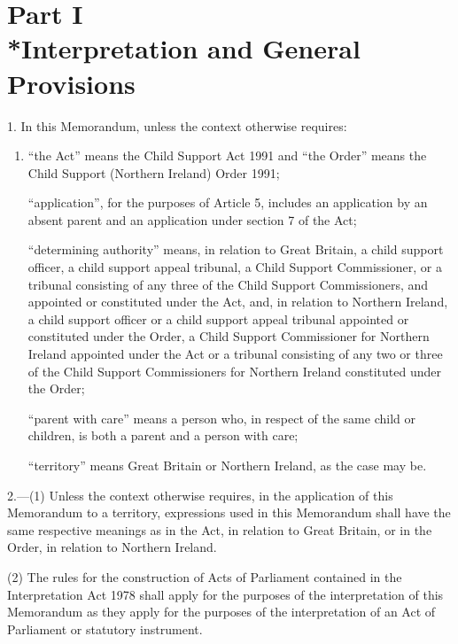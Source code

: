 \documentclass[a4paper]{article}
\newcommand{\parthead}{}
\begin{document}
\section[Part I --- Interpretation and General Provisions]{Part I\\*Interpretation and General Provisions}

\renewcommand\parthead{--- Schedule 1 Part I}

1.  In this Memorandum, unless the context otherwise requires:
\begin{enumerate}\item[]
“the Act” means the Child Support Act 1991 and “the Order” means the Child Support (Northern Ireland) Order 1991;

“application”, for the purposes of Article 5, includes an application by an absent parent and an application under section 7 of the Act;

“determining authority” means, in relation to Great Britain, a child support officer, a child support appeal tribunal, a Child Support Commissioner, or a tribunal consisting of any three of the Child Support Commissioners, and appointed or constituted under the Act, and, in relation to Northern Ireland, a child support officer or a child support appeal tribunal appointed or constituted under the Order, a Child Support Commissioner for Northern Ireland appointed under the Act or a tribunal consisting of any two or three of the Child Support Commissioners for Northern Ireland constituted under the Order;

“parent with care” means a person who, in respect of the same child or children, is both a parent and a person with care;

“territory” means Great Britain or Northern Ireland, as the case may be.
\end{enumerate}

\medskip

2.—(1) Unless the context otherwise requires, in the application of this Memorandum to a territory, expressions used in this Memorandum shall have the same respective meanings as in the Act, in relation to Great Britain, or in the Order, in relation to Northern Ireland.

(2) The rules for the construction of Acts of Parliament contained in the Interpretation Act 1978 shall apply for the purposes of the interpretation of this Memorandum as they apply for the purposes of the interpretation of an Act of Parliament or statutory instrument.

\medskip
\end{document}
